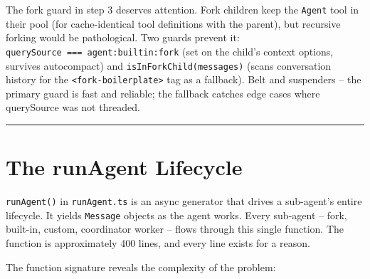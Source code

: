\documentclass[
  english,
  11pt,
  letterpaper,
]{book}
\begin{document}
The fork guard in step 3 deserves attention. Fork children keep the
\texttt{Agent} tool in their pool (for cache-identical tool definitions
with the parent), but recursive forking would be pathological. Two
guards prevent it:
\texttt{querySource\ ===\ \textquotesingle{}agent:builtin:fork\textquotesingle{}}
(set on the child's context options, survives autocompact) and
\texttt{isInForkChild(messages)} (scans conversation history for the
\texttt{\textless{}fork-boilerplate\textgreater{}} tag as a fallback).
Belt and suspenders -- the primary guard is fast and reliable; the
fallback catches edge cases where querySource was not threaded.

\begin{center}\rule{0.5\linewidth}{0.5pt}\end{center}

\section{The runAgent Lifecycle}\label{the-runagent-lifecycle}

\texttt{runAgent()} in \texttt{runAgent.ts} is an async generator that
drives a sub-agent's entire lifecycle. It yields \texttt{Message}
objects as the agent works. Every sub-agent -- fork, built-in, custom,
coordinator worker -- flows through this single function. The function
is approximately 400 lines, and every line exists for a reason.

The function signature reveals the complexity of the problem:
\end{document}
